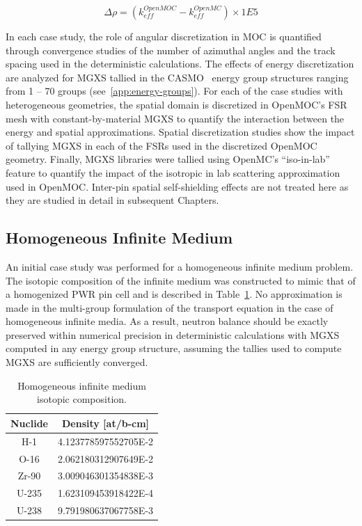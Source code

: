 \begin{equation}
\label{eqn:chap4-delta-rho}
\Delta\rho = \left(k_{eff}^{OpenMOC} - k_{eff}^{OpenMC}\right) \times 1E5
\end{equation}

In each case study, the role of angular discretization in \ac{MOC} is quantified through convergence studies of the number of azimuthal angles and the track spacing used in the deterministic calculations. The effects of energy discretization are analyzed for \ac{MGXS} tallied in the CASMO~\cite{rhodes2006casmo} energy group structures ranging from 1 -- 70 groups (see~\ref{app:energy-groups}). For each of the case studies with heterogeneous geometries, the spatial domain is discretized in OpenMOC's \ac{FSR} mesh with constant-by-material \ac{MGXS} to quantify the interaction between the energy and spatial approximations. Spatial discretization studies show the impact of tallying \ac{MGXS} in each of the \ac{FSR}s used in the discretized OpenMOC geometry. Finally, \ac{MGXS} libraries were tallied using OpenMC's ``iso-in-lab'' feature to quantify the impact of the isotropic in lab scattering approximation used in OpenMOC. Inter-pin spatial self-shielding effects are not treated here as they are studied in detail in subsequent Chapters.

\subsection{Homogeneous Infinite Medium}
\label{subsec:chap4-inf-medium}

An initial case study was performed for a homogeneous infinite medium problem. The isotopic composition of the infinite medium was constructed to mimic that of a homogenized \ac{PWR} pin cell and is described in Table~\ref{table:chap4-inf-med-isotopes}. No approximation is made in the multi-group formulation of the transport equation in the case of homogeneous infinite media. As a result, neutron balance should be exactly preserved within numerical precision in deterministic calculations with \ac{MGXS} computed in any energy group structure, assuming the tallies used to compute \ac{MGXS} are sufficiently converged.

\begin{table}[h!]
  \centering
  \caption[Infinite medium isotopic composition]{Homogeneous infinite medium isotopic composition.}
  \small
  \label{table:chap4-inf-med-isotopes} 
  \vspace{6pt}
  \begin{tabular}{c c}
  \toprule
  \multicolumn{1}{c}{\bf Nuclide} &
  \multicolumn{1}{c}{\bf Density [at/b-cm]} \\
  \midrule
  H-1 &   4.123778597552705E-2 \\
  O-16 &  2.062180312907649E-2 \\
  Zr-90 & 3.009046301354838E-3 \\
  U-235 & 1.623109453918422E-4 \\
  U-238 & 9.791980637067758E-3 \\
  \bottomrule
\end{tabular}
\end{table}

